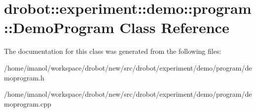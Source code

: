 \hypertarget{classdrobot_1_1experiment_1_1demo_1_1program_1_1DemoProgram}{\section{drobot\-:\-:experiment\-:\-:demo\-:\-:program\-:\-:Demo\-Program Class Reference}
\label{classdrobot_1_1experiment_1_1demo_1_1program_1_1DemoProgram}
}


The documentation for this class was generated from the following files\-:\begin{DoxyCompactItemize}
\item 
/home/imanol/workspace/drobot/new/src/drobot/experiment/demo/program/demoprogram.\-h\item 
/home/imanol/workspace/drobot/new/src/drobot/experiment/demo/program/demoprogram.\-cpp\end{DoxyCompactItemize}
